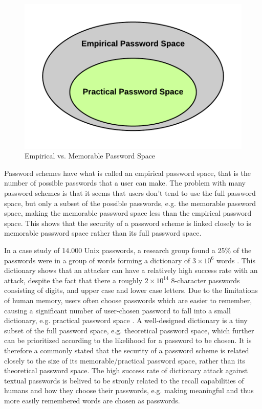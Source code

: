   \begin{figure}
    \vspace{-20pt}
    \begin{center}
      \includegraphics[scale=0.16]{pics/EmpiricalVsPractical.png}
    \end{center}
    \vspace{-20pt}
    \caption{Empirical vs. Memorable Password Space}
    \vspace{0pt}
  \end{figure}

  Password schemes have what is called an empirical password space, that is the number of possible passwords that a user can make. The problem with many password schemes is that it seems that users don't tend to use the full password space, but only a subset of the possible passwords, e.g. the memorable password space, making the memorable password space less than the empirical password space. This shows that the security of a password scheme is linked closely to is memorable password space rather than its full password space. 

  In a case study of 14.000 Unix passwords, a research group found a 25\% of the passwords were in a group of words forming a dictionary of $3\times10^{6}$ words \cite{UnixPasswords}. This dictionary shows that an attacker can have a relatively high success rate with an attack, despite the fact that there a roughly $2\times10^{14}$ 8-character passwords consisting of digits, and upper case and lower case letters. Due to the limitations of human memory, users often choose passwords which are easier to remember, causing a significant number of user-chosen password to fall into a small dictionary, e.g. practical password space \cite{Tao}. A well-designed dictionary is a tiny subset of the full password space, e.g. theoretical password space, which further can be prioritized  according to the likelihood for a password to be chosen. It is therefore a commonly stated that the security of a password scheme is related closely to the size of its memorable/practical password space, rather than its theoretical password space. The high success rate of dictionary attack against textual passwords is belived to be stronly related to the recall capabilities of humans and how they choose their passwords, e.g. making meaningful and thus more easily remembered words are chosen as passwords. 


